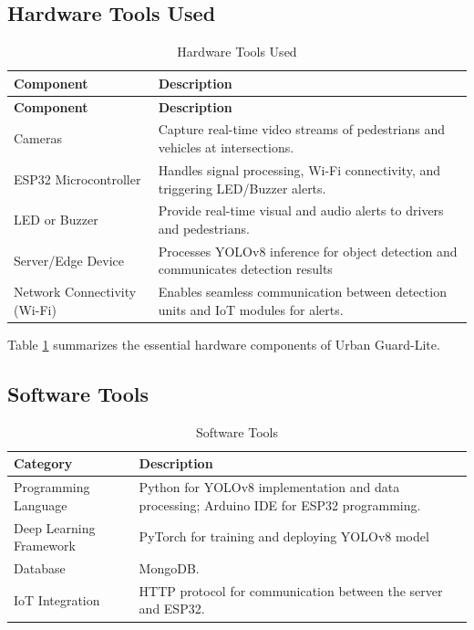 \documentclass[a4paper, 12pt]{report}
\begin{document}
\subsection{Hardware Tools Used}
\begin{longtable}{|p{}|p{}|}
    \caption{Hardware Tools Used}\label{tab:hardware_tools} \\
    
    \hline
    \textbf{Component} & \textbf{Description} \\
    \hline
    \endfirsthead
    
    \hline
    \textbf{Component} & \textbf{Description} \\
    \hline
    \endhead
    
    \hline
    \endfoot
    
    \hline
    \endlastfoot
    
    Cameras & Capture real-time video streams of pedestrians and vehicles at intersections. \\
    \hline
    ESP32 Microcontroller & Handles signal processing, Wi-Fi connectivity, and triggering LED/Buzzer alerts. \\
    \hline
    LED or Buzzer & Provide real-time visual and audio alerts to drivers and pedestrians. \\
    \hline
    Server/Edge Device & Processes YOLOv8 inference for object detection and communicates detection results \\
    \hline
    Network Connectivity (Wi-Fi) & Enables seamless communication between detection units and IoT modules for alerts. \\
\end{longtable}
Table \ref{tab:hardware_tools} summarizes the essential hardware components of Urban Guard-Lite.
\subsection{Software Tools}
\begin{table}[H]
\centering
\caption{Software Tools}\label{tab:software_Tools}
\begin{tabular}{|p{}|p{}|}
    \hline
    \textbf{Category} & \textbf{Description} \\ 
    \hline
    Programming Language & Python for YOLOv8 implementation and data processing; Arduino IDE for ESP32 programming. \\ 
    \hline
    Deep Learning Framework & PyTorch for training and deploying YOLOv8 model \\ 
    \hline
    Database & MongoDB.
    \\ \hline
    IoT Integration & HTTP protocol for communication between the server and ESP32. \\
\hline
\end{tabular}
\end{table}
\end{document}
